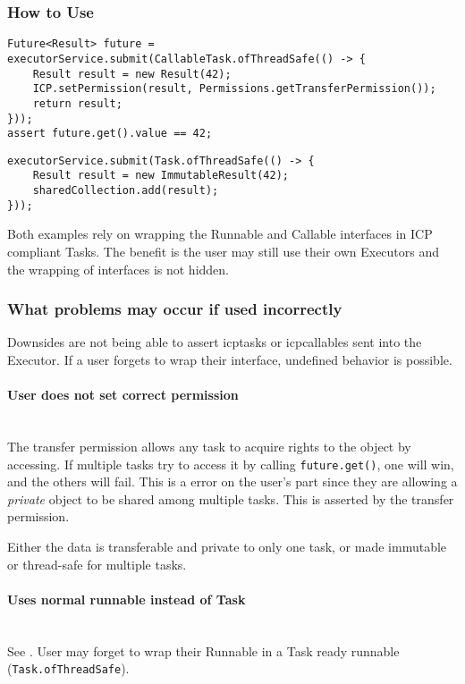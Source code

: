 \subsubsection*{How to Use}
    \begin{lstlisting}[caption=Wraping callable in CallableTask]
Future<Result> future = executorService.submit(CallableTask.ofThreadSafe(() -> {
    Result result = new Result(42);
    ICP.setPermission(result, Permissions.getTransferPermission());
    return result;
}));
assert future.get().value == 42;
    \end{lstlisting}
    \begin{lstlisting}[caption=Wrapping runnable in Task]
executorService.submit(Task.ofThreadSafe(() -> {
    Result result = new ImmutableResult(42);
    sharedCollection.add(result);
}));
    \end{lstlisting}

Both examples rely on wrapping the Runnable and Callable interfaces in ICP compliant Tasks.
The benefit is the user may still use their own Executors and the wrapping of interfaces is not
hidden.

\subsubsection*{What problems may occur if used incorrectly}
Downsides are not being able to assert \gls{icptask}s or \gls{icpcallable}s sent into the Executor.
If a user forgets to wrap their interface, undefined behavior is possible.

\paragraph*{User does not set correct permission}~\\
The transfer permission allows any task to acquire rights to the object by accessing. If multiple
tasks try to access it by calling \lstinline{future.get()}, one will win, and the others will fail.
This is a error on the user's part since they are allowing a \textit{private} object to be shared
among multiple tasks. This is asserted by the transfer permission.

Either the data is transferable and private to only one task, or made immutable or thread-safe for
multiple tasks.

\paragraph*{Uses normal runnable instead of Task}~ \\
See . User may forget to wrap their Runnable in a Task ready
runnable (\lstinline{Task.ofThreadSafe}).

